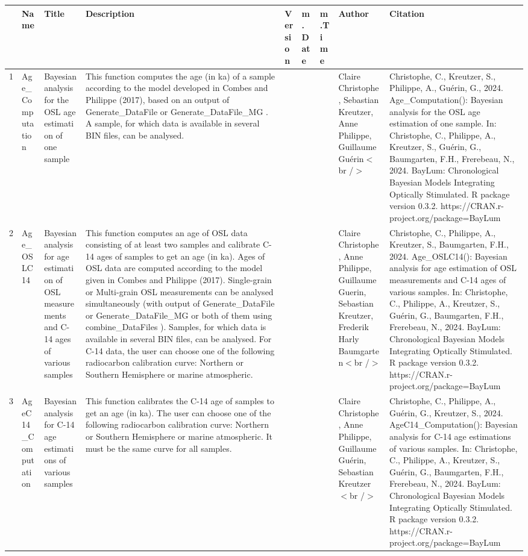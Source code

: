 \begin{table}[ht]
\centering
\begin{tabular}{rllllllll}
  \hline
 & Name & Title & Description & Version & m.Date & m.Time & Author & Citation \\ 
  \hline
1 & Age\_Computation & Bayesian analysis for the OSL age estimation of one sample & This function computes the age (in ka) of a sample according to the model developed in Combes and Philippe (2017), based on an output of  Generate\_DataFile  or  Generate\_DataFile\_MG .  A sample, for which data is available in several BIN files, can be analysed. &  &  &  & Claire Christophe, Sebastian Kreutzer, Anne Philippe, Guillaume Guérin$<$br /$>$ & Christophe, C., Kreutzer, S., Philippe, A., Guérin, G., 2024. Age\_Computation(): Bayesian analysis for the OSL age estimation of one sample. In: Christophe, C., Philippe, A., Kreutzer, S., Guérin, G., Baumgarten, F.H., Frerebeau, N., 2024. BayLum: Chronological Bayesian Models Integrating Optically Stimulated. R package version 0.3.2. https://CRAN.r-project.org/package=BayLum
 \\ 
  2 & Age\_OSLC14 & Bayesian analysis for age estimation of OSL measurements and C-14 ages of various samples & This function computes an age of OSL data consisting of at least two samples and calibrate C-14 ages of samples to get an age (in ka).  Ages of OSL data are computed according to the model given in Combes and Philippe (2017). Single-grain or Multi-grain OSL measurements can be analysed simultaneously (with output of  Generate\_DataFile  or  Generate\_DataFile\_MG  or both of them using  combine\_DataFiles ). Samples, for which data is available in several BIN files, can be analysed.  For C-14 data, the user can choose one of the following radiocarbon calibration curve: Northern or Southern Hemisphere or marine atmospheric. &  &  &  & Claire Christophe, Anne Philippe, Guillaume Guerin, Sebastian Kreutzer, Frederik Harly Baumgarten$<$br /$>$ & Christophe, C., Philippe, A., Kreutzer, S., Baumgarten, F.H., 2024. Age\_OSLC14(): Bayesian analysis for age estimation of OSL measurements and C-14 ages of various samples. In: Christophe, C., Philippe, A., Kreutzer, S., Guérin, G., Baumgarten, F.H., Frerebeau, N., 2024. BayLum: Chronological Bayesian Models Integrating Optically Stimulated. R package version 0.3.2. https://CRAN.r-project.org/package=BayLum
 \\ 
  3 & AgeC14\_Computation & Bayesian analysis for C-14 age estimations of various samples & This function calibrates the C-14 age of samples to get an age (in ka). The user can choose one of the following radiocarbon calibration curve: Northern or Southern Hemisphere or marine atmospheric. It must be the same curve for all samples. &  &  &  & Claire Christophe, Anne Philippe, Guillaume Guérin, Sebastian Kreutzer$<$br /$>$ & Christophe, C., Philippe, A., Guérin, G., Kreutzer, S., 2024. AgeC14\_Computation(): Bayesian analysis for C-14 age estimations of various samples. In: Christophe, C., Philippe, A., Kreutzer, S., Guérin, G., Baumgarten, F.H., Frerebeau, N., 2024. BayLum: Chronological Bayesian Models Integrating Optically Stimulated. R package version 0.3.2. https://CRAN.r-project.org/package=BayLum

\end{tabular}
\end{table}
